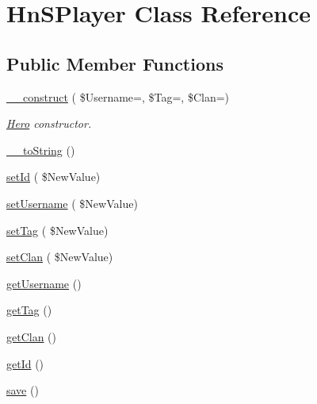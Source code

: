 \hypertarget{class_hn_s_player}{}\section{Hn\+S\+Player Class Reference}
\label{class_hn_s_player}
\subsection*{Public Member Functions}
\begin{DoxyCompactItemize}
\item 
\hyperlink{class_hn_s_player_a141a1116dc074bc7663af54af20ae922}{\+\_\+\+\_\+construct} ( \$Username=\textquotesingle{}\textquotesingle{}, \$Tag=\textquotesingle{}\textquotesingle{}, \$Clan=\textquotesingle{}\textquotesingle{})
\begin{DoxyCompactList}\small\item\em \hyperlink{class_hero}{Hero} constructor. \end{DoxyCompactList}\item 
\hyperlink{class_hn_s_player_acd155aa0574b72c8b59a92b1d8412eb6}{\+\_\+\+\_\+to\+String} ()
\item 
\hyperlink{class_hn_s_player_ae2b290bd8ed63b2045418386d616eb26}{set\+Id} ( \$New\+Value)
\item 
\hyperlink{class_hn_s_player_a431a710c7491d53ad935773288376767}{set\+Username} ( \$New\+Value)
\item 
\hyperlink{class_hn_s_player_ae89a8821f5115eedc4b3d576c797d78e}{set\+Tag} ( \$New\+Value)
\item 
\hyperlink{class_hn_s_player_ab3a0cb11bac6bef00d1aff09e1d9ab9e}{set\+Clan} ( \$New\+Value)
\item 
\hyperlink{class_hn_s_player_adb4543ae99d1d2d7e9cad39e5079bdfc}{get\+Username} ()
\item 
\hyperlink{class_hn_s_player_abc9a4f5e997c72d3051fa6ef54840e1d}{get\+Tag} ()
\item 
\hyperlink{class_hn_s_player_a5e34d30d1bb8bf76705af6bc9494985e}{get\+Clan} ()
\item 
\hyperlink{class_hn_s_player_ad3a3fcc2b75f6814fe25ad07f1c71b52}{get\+Id} ()
\item 
\hyperlink{class_hn_s_player_a8179db6105a3e571a42fd3ba25e10542}{save} ()
\end{DoxyCompactItemize}

